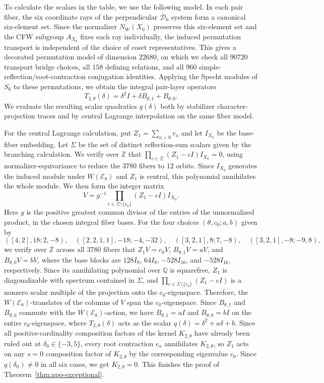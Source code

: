\documentclass[11pt,a4paper]{amsart}
\theoremstyle{uprightdefinition}
\theoremstyle{remark}\newtheorem{remark}[theorem]{Remark}
\begin{document}
To calculate the scalars in the table, we use the following model. In each pair
fiber, the six coordinate rays of the perpendicular $\mathscr{D}_6$ system form a canonical six-element set.
Since the normalizer $N_W(X_0)$ preserves this six-element set and the CFW subgroup $A_{X_0}$ fixes each ray
individually, the induced permutation transport is independent of the choice of coset representatives.
This gives a decorated permutation model of dimension
$22680$, on which we check all $90720$ transport bridge choices, all $158$
defining relations, and all $960$ simple-reflection/root-contraction
conjugation identities. Applying the Specht modules of $S_6$
to these permutations, we obtain the integral pair-layer operators
\[
 T_{2,\theta}(\delta)=\delta^2I+\delta B_{\theta,1}+B_{\theta,0}.
\]
We evaluate the resulting scalar quadratics $q(\delta)$ both by stabilizer character-projection
traces and by central Lagrange interpolation on the same fiber model.

For the central Lagrange calculation, put $Z_1=\sum_{a>0}r_a$
and let $I_{X_0}$ be the base-fiber embedding. Let $\Sigma$ be the set
of distinct reflection-sum scalars given by the branching calculation.
We verify over $\mathbb Z$ that
$\prod_{c\in\Sigma}(Z_1-cI)I_{X_0}=0$, using normalizer-equivariance
to reduce the $3780$ fibers to $12$ orbits.
Since $I_{X_0}$ generates the induced module under $W(\mathscr{E}_8)$ and $Z_1$
is central, this polynomial annihilates the whole module.
We then form the integer matrix
\[
 V=g^{-1}\prod_{c\in\Sigma\setminus\{c_0\}}(Z_1-cI)I_{X_0}.
\]
Here $g$ is the positive greatest common divisor of the entries of
the unnormalized product, in the chosen integral fiber bases.
For the four choices $(\theta,c_0;a,b)$ given by
\[
 ([4,2],18;2,-8),\quad([2,2,1,1],-18;-4,-32),\quad
 ([3,2,1],8;7,-8),\quad([3,2,1],-8;-9,8),
\]
we verify over $\mathbb Z$ across all $3780$ fibers that
$Z_1V=c_0V$, $B_{\theta,1}V=aV$, and $B_{\theta,0}V=bV$, where the base blocks are $128I_9$, $64I_9$, $-528I_{16}$, and $-528I_{16}$, respectively.
Since its annihilating polynomial over $\mathbb Q$ is squarefree, $Z_1$ is
diagonalizable with spectrum contained in $\Sigma$, and
$\prod_{c\in\Sigma\setminus\{c_0\}}(Z_1-cI)$ is a nonzero scalar
multiple of the projection onto the $c_0$-eigenspace. Therefore, the $W(\mathscr{E}_8)$-translates
of the columns of $V$ span the $c_0$-eigenspace. Since
$B_{\theta,1}$ and $B_{\theta,0}$ commute with the $W(\mathscr{E}_8)$-action, we have
$B_{\theta,1}=aI$ and $B_{\theta,0}=bI$ on the entire $c_0$-eigenspace, where
$T_{2,\theta}(\delta)$ acts as the scalar $q(\delta)=\delta^2+a\delta+b$.
Since all positive-cardinality composition factors of the kernel $K_{2,\theta}$ have already been ruled out at $\delta_0\in\{-3,5\}$, every root contraction $e_a$
annihilates $K_{2,\theta}$, so $Z_1$ acts on any $s=0$ composition factor of $K_{2,\theta}$ by the corresponding eigenvalue $c_0$. Since $q(\delta_0)\ne0$ in all six cases, we get $K_{2,\theta}=0$.
This finishes the proof of Theorem~\ref{thm:app-exceptional}.
\end{document}
